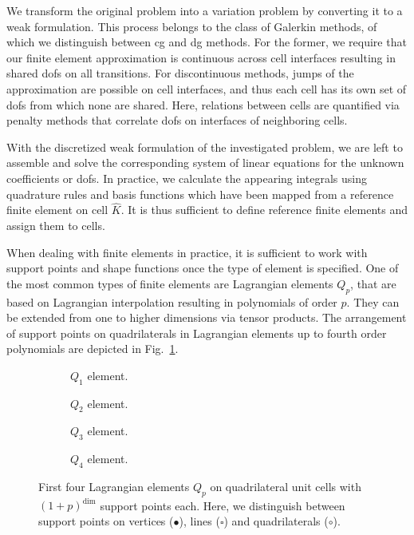 We transform the original problem into a variation problem by converting it to a weak formulation. This process belongs to the class of Galerkin methods, of which we distinguish between \gls{cg} and \gls{dg} methods. For the former, we require that our finite element approximation is continuous across cell interfaces resulting in shared \glspl{dof} on all transitions. For discontinuous methods, jumps of the approximation are possible on cell interfaces, and thus each cell has its own set of \glspl{dof} from which none are shared. Here, relations between cells are quantified via penalty methods that correlate \glspl{dof} on interfaces of neighboring cells.

With the discretized weak formulation of the investigated problem, we are left to assemble and solve the corresponding system of linear equations for the unknown coefficients or \glspl{dof}. In practice, we calculate the appearing integrals using quadrature rules and basis functions which have been mapped from a reference finite element on cell $\widehat{K}$. It is thus sufficient to define reference finite elements and assign them to cells.

When dealing with finite elements in practice, it is sufficient to work with support points and shape functions once the type of element is specified. One of the most common types of finite elements are Lagrangian elements $Q_p$, that are based on Lagrangian interpolation resulting in polynomials of order $p$. They can be extended from one to higher dimensions via tensor products. The arrangement of support points on quadrilaterals in Lagrangian elements up to fourth order polynomials are depicted in Fig.~\ref{fig:lagrange}.

\begin{figure}
\begin{subfigure}{.24\textwidth}
  \centering
  
  \caption{$Q_1$ element.}
\end{subfigure}
\begin{subfigure}{.24\textwidth}
  \centering
  
  \caption{$Q_2$ element.}
\end{subfigure}
\begin{subfigure}{.24\textwidth}
  \centering
  
  \caption{$Q_3$ element.}
\end{subfigure}
\begin{subfigure}{.24\textwidth}
  \centering
  
  \caption{$Q_4$ element.}
\end{subfigure}
\caption[Lagrangian elements $Q_p$.]{First four Lagrangian elements $Q_p$ on quadrilateral unit cells with $(1+p)^\text{dim}$ support points each. Here, we distinguish between support points on vertices ($\bullet$), lines ($\square$) and quadrilaterals ($\circ$).}
\label{fig:lagrange}
\end{figure}

